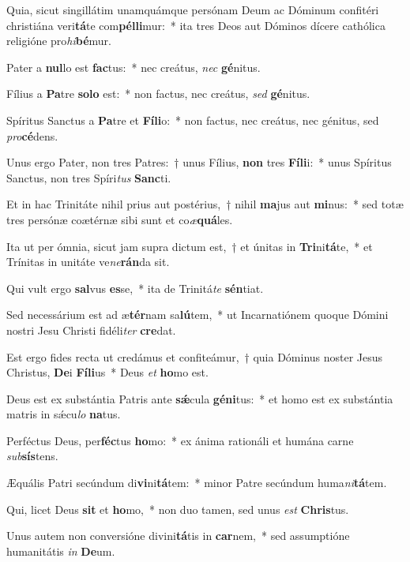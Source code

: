 \item Quia, sicut singillátim unamquámque persónam Deum ac Dóminum confitéri christiána veri\textbf{tá}te com\textbf{pél}\textbf{li}mur:~* ita tres Deos aut Dóminos dícere cathólica religióne pro\textit{hi}\textbf{bé}mur.
\item Pater a \textbf{nul}lo est \textbf{fac}tus:~* nec creátus, \textit{nec} \textbf{gé}nitus.
\item Fílius a \textbf{Pa}tre \textbf{so}\textbf{lo} est:~* non factus, nec creátus, \textit{sed} \textbf{gé}nitus.
\item Spíritus Sanctus a \textbf{Pa}tre et \textbf{Fí}\textbf{li}o:~* non factus, nec creátus, nec génitus, sed \textit{pro}\textbf{cé}dens.
\item Unus ergo Pater, non tres Patres:~† unus Fílius, \textbf{non} tres \textbf{Fí}\textbf{li}i:~* unus Spíritus Sanctus, non tres Spíri\textit{tus} \textbf{Sanc}ti.
\item Et in hac Trinitáte nihil prius aut postérius,~† nihil \textbf{ma}jus aut \textbf{mi}nus:~* sed totæ tres persónæ coætérnæ sibi sunt et co\textit{æ}\textbf{quá}les.
\item Ita ut per ómnia, sicut jam supra dictum est,~† et únitas in \textbf{Tri}ni\textbf{tá}te,~* et Trínitas in unitáte ve\textit{ne}\textbf{rán}da sit.
\item Qui vult ergo \textbf{sal}vus \textbf{es}se,~* ita de Trinitá\textit{te} \textbf{sén}tiat.
\item Sed necessárium est ad æ\textbf{tér}nam sa\textbf{lú}tem,~* ut Incarnatiónem quoque Dómini nostri Jesu Christi fidéli\textit{ter} \textbf{cre}dat.
\item Est ergo fides recta ut credámus et confiteámur,~† quia Dóminus noster Jesus Christus, \textbf{De}i \textbf{Fí}\textbf{li}us~* Deus \textit{et} \textbf{ho}mo est.
\item Deus est ex substántia Patris ante \textbf{sǽ}cula \textbf{gé}\textbf{ni}tus:~* et homo est ex substántia matris in sǽcu\textit{lo} \textbf{na}tus.
\item Perféctus Deus, per\textbf{féc}tus \textbf{ho}mo:~* ex ánima rationáli et humána carne \textit{sub}\textbf{sís}tens.
\item Æquális Patri secúndum di\textbf{vi}ni\textbf{tá}tem:~* minor Patre secúndum huma\textit{ni}\textbf{tá}tem.
\item Qui, licet Deus \textbf{sit} et \textbf{ho}mo,~* non duo tamen, sed unus \textit{est} \textbf{Chris}tus.
\item Unus autem non conversióne divini\textbf{tá}tis in \textbf{car}nem,~* sed assumptióne humanitátis \textit{in} \textbf{De}um.
